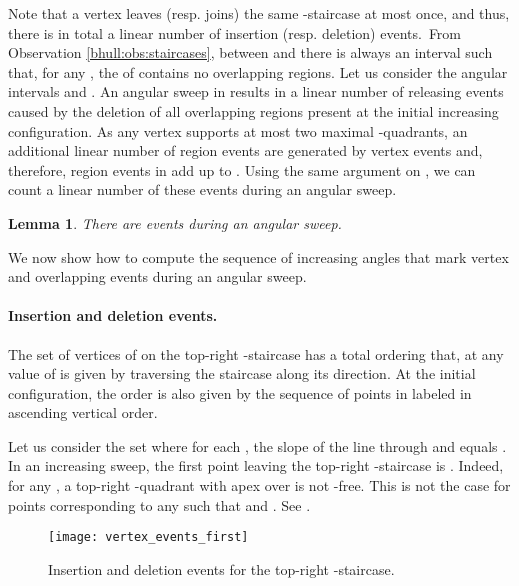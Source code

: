 \documentclass[11pt,letterpaper,english]{article}
\newtheorem{lemma}{Lemma}
\theoremstyle{definition}
\begin{document}
Note that a vertex leaves (resp. joins) the same -staircase at
most once, and thus, there is in total a linear number of insertion
(resp. deletion) events.~From Observation \ref{bhull:obs:staircases},
between  and  there is always an interval
 such that, for any
, the  of  contains no overlapping
regions. Let us consider the angular intervals
 and .
An angular sweep in  results in a linear number of releasing
events caused by the deletion of all overlapping regions present at
the initial increasing configuration. As any vertex supports at most
two maximal -quadrants, an additional linear number of region
events are generated by vertex events and, therefore, region events in
 add up to . Using the same argument on , we can
count a linear number of these events during an angular sweep.

\begin{lemma}\label{bhull:lemma:linear_events}
  There are  events during an angular sweep.
\end{lemma}

We now show how to compute the sequence of increasing angles that mark
vertex and overlapping events during an angular sweep.

\paragraph{Insertion and deletion events.}

The set of vertices of  on the top-right -staircase
has a total ordering that, at any value of  is given by
traversing the staircase along its direction. At the
initial configuration, the order is also given by the sequence
 of points in  labeled in ascending vertical
order.

Let us consider the set
 where for each
, the slope of the line through  and  equals
. In an increasing sweep, the first point leaving
the top-right -staircase is .
Indeed, for any , a
top-right -quadrant with apex over  is not -free. This
is not the case for points corresponding to any  such that
 and . See .

\begin{figure}[ht]
  \centering
  \begin{minipage}{0.9\textwidth}
    \centering
    \texttt{[image: vertex\_events\_first]}
\caption{Insertion and deletion events for the top-right
      -staircase.}
    \label{bhull:fig:events}
  \end{minipage}
\end{figure}
\end{document}
